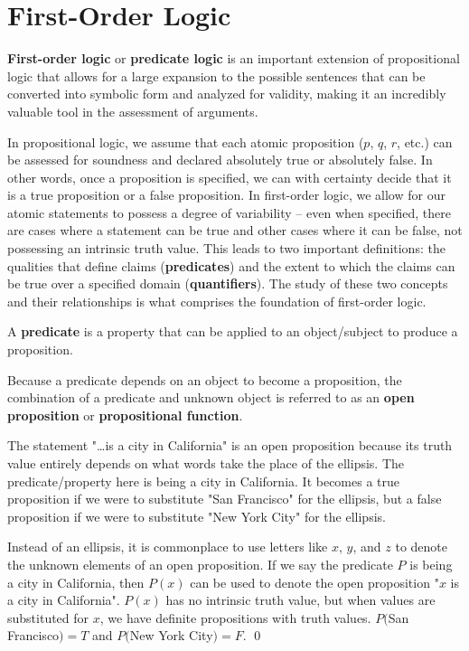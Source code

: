     \section{First-Order Logic}\label{sec:folog}

        \textbf{First-order logic} or \textbf{predicate logic} is an important extension of propositional logic that allows for a large expansion to the possible sentences that can be converted into symbolic form and analyzed for validity, making it an incredibly valuable tool in the assessment of arguments.

        In propositional logic, we assume that each atomic proposition ($p$, $q$, $r$, etc.) can be assessed for soundness and declared absolutely true or absolutely false. In other words, once a proposition is specified, we can with certainty decide that it is a true proposition or a false proposition. In first-order logic, we allow for our atomic statements to possess a degree of variability -- even when specified, there are cases where a statement can be true and other cases where it can be false, not possessing an intrinsic truth value. This leads to two important definitions: the qualities that define claims (\textbf{predicates}) and the extent to which the claims can be true over a specified domain (\textbf{quantifiers}). The study of these two concepts and their relationships is what comprises the foundation of first-order logic.

        \begin{definition}[Predicate]\label{def:predicate}
            A \textbf{predicate} is a property that can be applied to an object/subject to produce a proposition.
        \end{definition}

        Because a predicate depends on an object to become a proposition, the combination of a predicate and unknown object is referred to as an \textbf{open proposition} or \textbf{propositional function}.

        \begin{example}[Predicate]\label{ex:predicate}
            The statement "\ldots is a city in California" is an open proposition because its truth value entirely depends on what words take the place of the ellipsis. The predicate/property here is being a city in California. It becomes a true proposition if we were to substitute "San Francisco" for the ellipsis, but a false proposition if we were to substitute "New York City" for the ellipsis.

            Instead of an ellipsis, it is commonplace to use letters like $x$, $y$, and $z$ to denote the unknown elements of an open proposition. If we say the predicate $P$ is being a city in California, then $P(x)$ can be used to denote the open proposition "$x$ is a city in California". $P(x)$ has no intrinsic truth value, but when values are substituted for $x$, we have definite propositions with truth values. $P($San Francisco$) = T$ and $P($New York City$) = F$. \qed
        \end{example}


